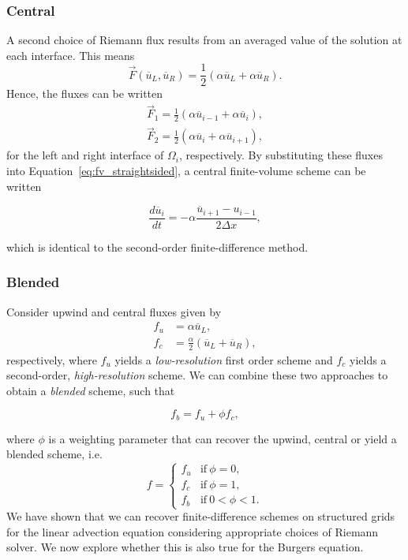 \subsubsection{Central}
A second choice of Riemann flux results from an averaged value of the solution at each interface. This means
\begin{equation}
 \vec F(\overline u_L, \overline u_R) = \frac{1}{2}\left(\alpha \overline u_L + \alpha \overline u_R \right).
\end{equation}
Hence, the fluxes can be written
\begin{align}
 \vec F_1 = \frac{1}{2}\left(\alpha \overline u_{i-1} + \alpha \overline u_{i} \right),\\
 \vec F_2 = \frac{1}{2}\left(\alpha \overline u_{i} + \alpha \overline u_{i+1} \right),
\end{align}
for the left and right interface of $\Omega_i$, respectively. By substituting these fluxes into Equation~\ref{eq:fv_straightsided}, a central finite-volume scheme can be written
\begin{eqBox}
\begin{equation}
 \frac{d\overline u_i}{dt} = - \alpha \frac{\overline u_{i+1} - u_{i-1}}{2 \Delta x},
\end{equation}
\end{eqBox}
which is identical to the second-order finite-difference method. 
\subsubsection{Blended}
Consider upwind and central fluxes given by
\begin{align}
 f_u & = \alpha \overline u_L, \\
 f_c & = \frac{\alpha}{2} \left(\overline u_L + \overline u_R \right),
\end{align}
respectively, where $f_u$ yields a \textit{low-resolution} first order scheme and $f_c$ yields a second-order, \textit{high-resolution} scheme. We can combine these two approaches to obtain a \textit{blended} scheme, such that
\begin{eqBox}
\begin{equation}
 f_b = f_u + \phi f_c,
\end{equation}
\end{eqBox}
where $\phi$ is a weighting parameter that can recover the upwind, central or yield a blended scheme, i.e.
\[
 f = 
\begin{cases}
 f_u & \text{if}~\phi = 0, \\
 f_c & \text{if}~\phi = 1, \\ 
 f_b & \text{if}~0 < \phi < 1. 
\end{cases}
\]
We have shown that we can recover finite-difference schemes on structured grids for the linear advection equation considering appropriate choices of Riemann solver. We now explore whether this is also true for the Burgers equation.

